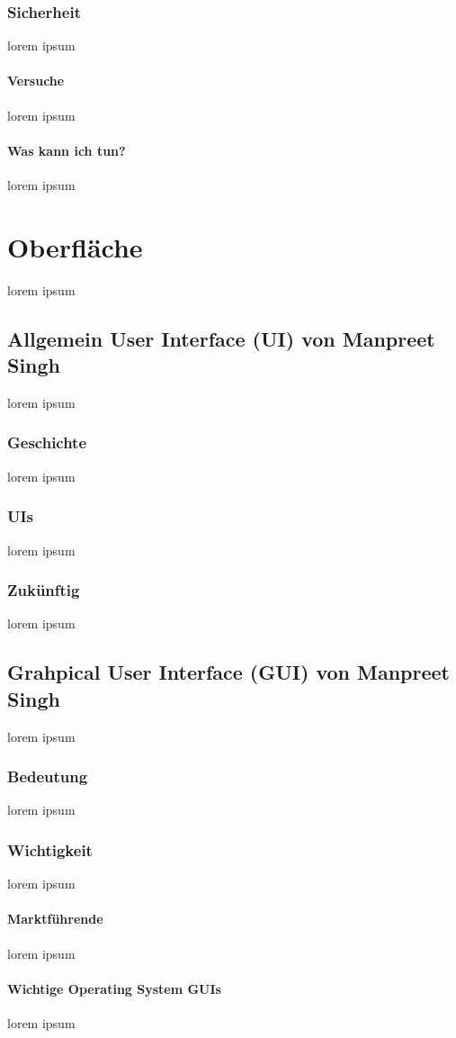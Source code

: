 \documentclass[12pt,a4paper]{report}
\begin{document}
\subsubsection{Sicherheit}
lorem ipsum
\paragraph{Versuche}
lorem ipsum
\paragraph{Was kann ich tun?}
lorem ipsum

\section{Oberfläche}
lorem ipsum
\subsection{Allgemein User Interface (UI) von Manpreet Singh}
lorem ipsum
\subsubsection{Geschichte}
lorem ipsum
\subsubsection{UIs}
lorem ipsum 
\subsubsection{Zukünftig}
lorem ipsum 
\subsection{Grahpical User Interface (GUI) von Manpreet Singh}
lorem ipsum
\subsubsection{Bedeutung}
lorem ipsum
\subsubsection{Wichtigkeit}
lorem ipsum
\paragraph{Marktführende}
lorem ipsum
\paragraph{Wichtige Operating System GUIs}
lorem ipsum
\end{document}
